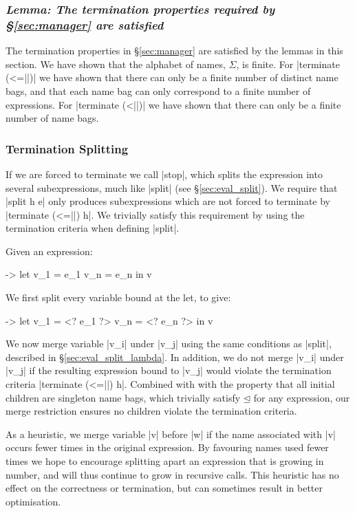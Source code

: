 \documentclass[draft]{sigplanconf}
\newcommand{\lemma}[1]{\subsubsection*{\textit{Lemma: #1}}}
\begin{document}
\lemma{The termination properties required by \S\ref{sec:manager} are satisfied}

The termination properties in \S\ref{sec:manager} are satisfied by the lemmas in this section. We have shown that the alphabet of names, $\Sigma$, is finite. For |terminate (<=||)| we have shown that there can only be a finite number of distinct name bags, and that each name bag can only correspond to a finite number of expressions. For |terminate (<||)| we have shown that there can only be a finite number of name bags.

\subsubsection{Termination Splitting}
\label{sec:term_split}

If we are forced to terminate we call |stop|, which splits the expression into several subexpressions, much like |split| (see \S\ref{sec:eval_split}). We require that |split h e| only produces subexpressions which are not forced to terminate by |terminate (<=||) h|. We trivially satisfy this requirement by using the termination criteria when defining |split|.

Given an expression:

\begin{code}
\free ->  let  v_1 = e_1
               v_n = e_n
          in   v
\end{code}

We first split every variable bound at the let, to give:

\begin{code}
\free ->  let  v_1 = <? e_1 ?>
               v_n = <? e_n ?>
          in   v
\end{code}

We now merge variable |v_i| under |v_j| using the same conditions as |split|, described in \S\ref{sec:eval_split_lambda}. In addition, we do not merge |v_i| under |v_j| if the resulting expression bound to |v_j| would violate the termination criteria |terminate (<=||) h|. Combined with with the property that all initial children are singleton name bags, which trivially satisfy $\unlhd$ for any expression, our merge restriction ensures no children violate the termination criteria.

As a heuristic, we merge variable |v| before |w| if the name associated with |v| occurs fewer times in the original expression. By favouring names used fewer times we hope to encourage splitting apart an expression that is growing in number, and will thus continue to grow in recursive calls. This heuristic has no effect on the correctness or termination, but can sometimes result in better optimisation.
\end{document}
